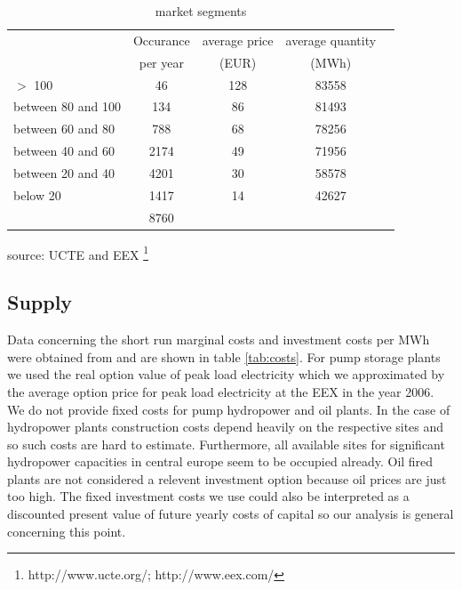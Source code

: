 \begin{table}
\begin{center}
\begin{tabular}{lllll}
\hline
 & \multicolumn{1}{c}{Occurance} & \multicolumn{1}{c}{average price} & \multicolumn{1}{c}{average quantity} &  \\ 
 & \multicolumn{1}{c}{per year} & \multicolumn{1}{c}{(EUR)} & \multicolumn{1}{c}{(MWh)} &  \\ 
 \hline
$>$ 100 & \multicolumn{1}{c}{46} & \multicolumn{1}{c}{128} & \multicolumn{1}{c}{83558} &  \\ 
between 80 and 100 & \multicolumn{1}{c}{134} & \multicolumn{1}{c}{86} & \multicolumn{1}{c}{81493} &  \\ 
between 60 and 80 & \multicolumn{1}{c}{788} & \multicolumn{1}{c}{68} & \multicolumn{1}{c}{78256} &  \\ 
between 40 and 60 & \multicolumn{1}{c}{2174} & \multicolumn{1}{c}{49} & \multicolumn{1}{c}{71956} &  \\ 
between 20 and 40 & \multicolumn{1}{c}{4201} & \multicolumn{1}{c}{30} & \multicolumn{1}{c}{58578} &  \\ 
below 20 & \multicolumn{1}{c}{1417} & \multicolumn{1}{c}{14} & \multicolumn{1}{c}{42627} &  \\
\hline
 & \multicolumn{1}{c}{8760} &  &  &  \\ 
 \hline
\end{tabular}
\end{center}
\label{tab:demand}
\caption{market segments}
\begin{center}
source: UCTE and EEX \footnote{http://www.ucte.org/; http://www.eex.com/}
\end{center}    
\end{table}

\subsection{Supply}

Data concerning the short run marginal costs and investment costs per MWh were obtained from \cite[p.46]{Auer2006} and are shown in table \ref{tab:costs}. For pump storage plants we used the real option value of peak load electricity which we approximated by the average option price for peak load electricity at the EEX in the year 2006. We do not provide fixed costs for pump hydropower and oil plants. In the case of hydropower plants construction costs depend heavily on the respective sites and so such costs are hard to estimate. Furthermore, all available sites for significant hydropower capacities in central europe seem to be occupied already. Oil fired plants are not considered a relevent investment option because oil prices are just too high. The fixed investment costs we use could also be interpreted as a discounted present value of future yearly costs of capital so our analysis is general concerning this point.

